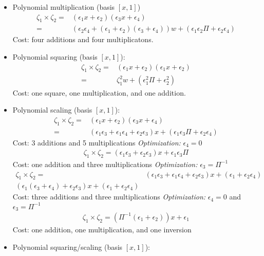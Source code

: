 \begin{itemize}
	\item Polynomial multiplication (basis $[x, 1]$)
	\begin{align*}
	\zeta_1 \times \zeta_2 = & (\epsilon_1 x + \epsilon_2)(\epsilon_3 x + \epsilon_4) \\
	= & (\epsilon_2\epsilon_4 + (\epsilon_1 + \epsilon_2)(\epsilon_3 + \epsilon_4)) w + (\epsilon_1\epsilon_2\Pi + \epsilon_2\epsilon_4)
	\end{align*}
	Cost: four additions and four multiplicatons.
	\item Polynomial squaring (basis $[x, 1]$): 
	\begin{align*}
	\zeta_1 \times \zeta_2 = & (\epsilon_1 x + \epsilon_2)(\epsilon_1 x + \epsilon_2) \\
	= & \zeta_1^2 w + (\epsilon_1^2\Pi + \epsilon_2^2)
	\end{align*}
	Cost: one square, one multiplication, and one addition.
	\item Polynomial scaling (basis $[x, 1]$): 
	\begin{align*}
	\zeta_1 \times \zeta_2 = & (\epsilon_1 x + \epsilon_2)(\epsilon_3 x + \epsilon_4)\\
	= & (\epsilon_1\epsilon_3 + \epsilon_1\epsilon_4 + \epsilon_2\epsilon_3) x + (\epsilon_1\epsilon_3\Pi + \epsilon_2\epsilon_4)
	\end{align*}
	Cost: 3 additions and 5 multiplications
	\emph{Optimization:} $\epsilon_4 = 0$
	\begin{align*}
	\zeta_1 \times \zeta_2 = (\epsilon_1\epsilon_3 + \epsilon_2\epsilon_3)x + \epsilon_1\epsilon_3\Pi
	\end{align*}
	Cost: one addition and three multiplications
	\emph{Optimization:} $\epsilon_3 = \Pi^{-1}$
	\begin{align*}
	\zeta_1 \times \zeta_2 = & (\epsilon_1\epsilon_3 + \epsilon_1\epsilon_4 + \epsilon_2\epsilon_3) x + (\epsilon_1 + \epsilon_2\epsilon_4) \\
	(\epsilon_1(\epsilon_3 + \epsilon_4) + \epsilon_2\epsilon_3) x + (\epsilon_1 + \epsilon_2\epsilon_4)
	\end{align*}
	Cost: three additions and three multiplications
	\emph{Optimization:} $\epsilon_4 = 0$ and $\epsilon_3 = \Pi^{-1}$
	\begin{align*}
	\zeta_1 \times \zeta_2 = (\Pi^{-1}(\epsilon_1 + \epsilon_2))x + \epsilon_1
	\end{align*}
	Cost: one addition, one multiplication, and one inversion
	\item Polynomial squaring/scaling (basis $[x, 1]$): 

\end{itemize}
